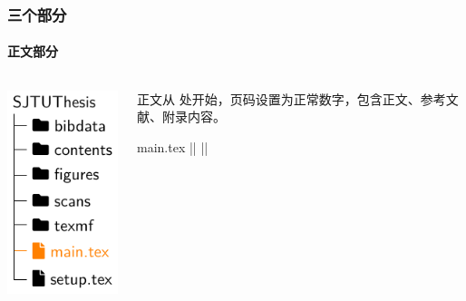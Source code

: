 \begin{frame}[fragile]
  \frametitle{三个部分}
  \framesubtitle{正文部分}
  \begin{columns}
    \begin{column}{0.4\textwidth}
      \includegraphics[page=8]{support/figures/thesisdir.pdf}
    \end{column}
    \begin{column}{0.6\textwidth}
      正文从  处开始，页码设置为正常数字，包含正文、参考文献、附录内容。
      \begin{codeblock}[firstnumber=47]{main.tex}
|\highlightline|%
|\highlightline|\mainmatter







\printbibliography[heading=bibintoc]

\appendix
      \end{codeblock}
    \end{column}
  \end{columns}
\end{frame}

